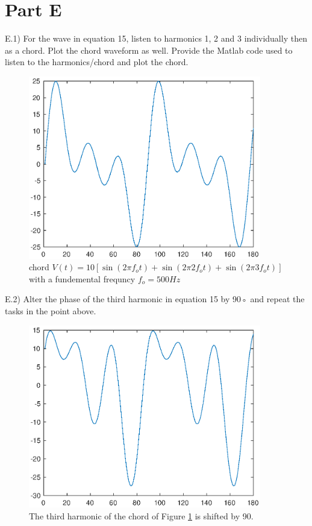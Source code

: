\section*{Part E}

\begin{tcolorbox}
  E.1) For the wave in equation 15, listen to harmonics 1, 2 and 3 individually then as a chord. Plot the chord waveform as well. Provide the Matlab code used to listen to the harmonics/chord and plot the chord.
\end{tcolorbox}



\begin{figure}[htbp]
  \centering
  \includegraphics [width=4in]{matlab/fig/E_r_1.eps}  
  \caption{chord $V(t)=10[\sin(2\pi f_o t)+\sin(2\pi 2f_o t)+\sin(2\pi 3f_o t)]$ with a fundemental frequncy $f_o=500Hz$}    
  \label{fig:E_r_1}
\end{figure}

\begin{tcolorbox}
  E.2) Alter the phase of the third harmonic in equation 15 by 90◦ and repeat the tasks in the point above.
\end{tcolorbox}



\begin{figure}[htbp]
  \centering
  \includegraphics [width=4in]{matlab/fig/E_r_2.eps}  
  \caption{The third harmonic of the chord of Figure \ref{fig:E_r_1} is shifted by 90\textdegree.}
  \label{fig:E_r_2}
\end{figure}


